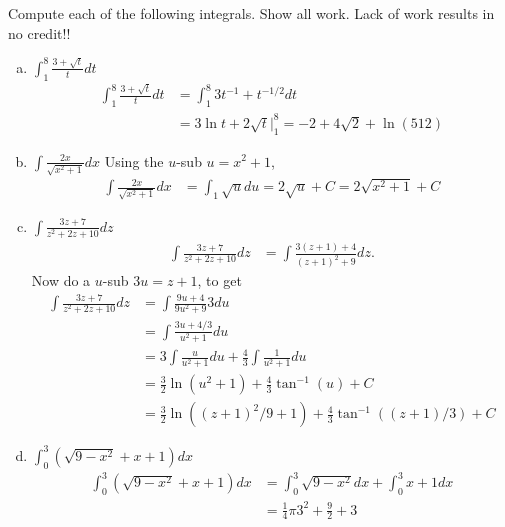 \documentclass[11pt]{exam}
\theoremstyle{definition}
\begin{document}
\begin{questions}
\newpage
\question[10]
Compute each of the following integrals.  Show all work.
Lack of work results in no credit!!
\begin{enumerate}[(a)]
\item $\int_1^8 \frac{3 + \sqrt{t}}{t}dt$
\begin{align*}
\int_1^8 \frac{3 + \sqrt{t}}{t}dt
  & = \int_1^8 3t^{-1} + t^{-1/2} dt\\
  & = 3\ln t + 2\sqrt{t} |_1^8 = -2 + 4\sqrt{2} + \ln(512)
\end{align*}
\item $\int\frac{2x}{\sqrt{x^2+1}}dx$
Using the $u$-sub $u = x^2 +1$,
\begin{align*}
\int\frac{2x}{\sqrt{x^2+1}} dx
  & = \int_{1}{\sqrt{u}}du = 2\sqrt{u} + C = 2\sqrt{x^2+1} + C
\end{align*}
\item $\int \frac{3z + 7}{z^2 + 2z + 10} dz$
\begin{align*}
\int \frac{3z + 7}{z^2 + 2z + 10} dz
  & = \int \frac{3(z+1) + 4}{(z+1)^2 + 9} dz.
\end{align*}
Now do a $u$-sub $3u =z+1$, to get
\begin{align*}
\int \frac{3z + 7}{z^2 + 2z + 10} dz
  & = \int \frac{9u + 4}{9u^2 + 9} 3du\\
  & = \int \frac{3u + 4/3}{u^2 + 1} du\\
  & = 3\int \frac{u}{u^2 + 1} du + \frac{4}{3}\int \frac{1}{u^2 + 1} du\\
  & = \frac{3}{2}\ln(u^2+1) + \frac{4}{3}\tan^{-1}(u) + C\\
  & = \frac{3}{2}\ln((z+1)^2/9+1) + \frac{4}{3}\tan^{-1}((z+1)/3) + C
\end{align*}
\item $\int_0^3 (\sqrt{9-x^2} + x + 1)dx$
\begin{align*}
\int_0^3 (\sqrt{9-x^2} + x + 1)dx
  & = \int_0^3 \sqrt{9-x^2}dx + \int_0^3 x + 1dx\\
  & = \frac{1}{4}\pi 3^2 + \frac{9}{2} + 3
\end{align*}
\end{enumerate}


\end{questions}
\end{document}
